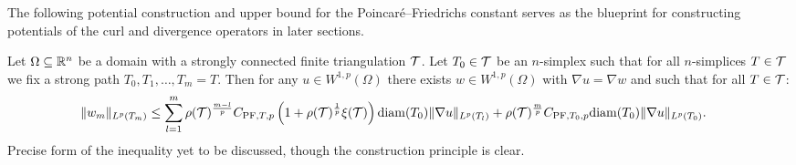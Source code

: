 \documentclass[a4paper]{article}
\begin{document}
The following potential construction and upper bound for the Poincar\'e--Friedrichs constant 
serves as the blueprint for constructing potentials of the curl and divergence operators in later sections. 

\begin{theorem}\label{theorem:poincarefriedrichsestimate:gradzwei}
    Let $\Omega \subseteq {\mathbb R}^{n}$ be a domain with a strongly connected finite triangulation ${\mathcal T}$.
    Let $T_0 \in {\mathcal T}$ be an $n$-simplex such that for all $n$-simplices $T \in {\mathcal T}$ 
    we fix a strong path $T_0, T_1, \dots, T_m = T$.
    Then for any $u \in W^{1,p}(\Omega)$ 
    there exists $w \in W^{1,p}(\Omega)$ with $\nabla u = \nabla w$ 
    and such that for all $T \in {\mathcal T}$:
    \begin{align*}
        \| w_{m} \|_{L^{p}(T_m)}
        &\leq 
        \sum_{l=1}^{m} 
        \rho({\mathcal T})^{\frac{m-l}{p}}
        C_{{\rm PF},T,p} \left( 1 + \rho({\mathcal T})^{\frac 1 p} \xi({\mathcal T}) \right) {\operatorname{diam}}(T_{0})
        \| \nabla u \|_{L^{p}( T_{l} )}
        +
        \rho({\mathcal T})^{\frac m p}
        C_{{\rm PF},T_{0},p} {\operatorname{diam}}(T_{0})
        \| \nabla u \|_{L^{p}( T_{0} )}
        .
    \end{align*}
    \color{red}Precise form of the inequality yet to be discussed, though the construction principle is clear.
\end{theorem}
\end{document}
